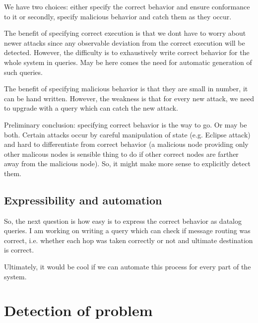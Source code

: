 We have two choices: either specify the correct behavior and ensure 
conformance to it or secondly, specify malicious behavior and catch 
them as they occur. 
 
The benefit of specifying correct execution is that we dont have to 
worry about newer attacks since any observable deviation from the 
correct execution will be detected. However, the difficulty is to 
exhaustively write correct behavior for the whole system in 
queries. May be here comes the  
need for automatic generation of such queries. 
 
The benefit of specifying malicious behavior is that they are small in 
number, it can be hand written. However, the weakness is that for every 
new attack, we need to upgrade with a query which can catch the new 
attack.  
 
Preliminary conclusion: specifying correct behavior is the way to 
go. Or may be both. Certain attacks occur by careful manipulation of 
state (e.g. Eclipse attack) and hard to differentiate from correct 
behavior (a malicious node providing only other malicous nodes is 
sensible thing to do if other correct nodes are farther away from the 
malicious node). So, it might make more sense to explicitly detect 
them. 
 
 
\subsection{Expressibility and automation} 
 
So, the next question is how easy is to express the correct behavior 
as datalog queries. I am working on writing a query which can check if 
message routing was correct, i.e. whether each hop was taken correctly 
or not and ultimate destination is correct. 
 
Ultimately, it would be cool if we can automate 
this process for every part of the system. 
 
\fi 
 
\section{Detection of problem} 
 
